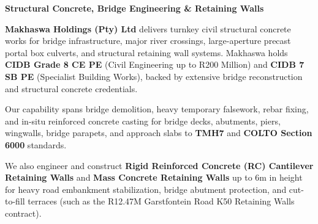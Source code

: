 \documentclass[a4paper,11pt]{article}
\begin{document}
\noindent
\begin{minipage}[t]{0.62\textwidth}
    \vspace{0pt}
    {\large\bfseries\color{mhnavy} Structural Concrete, Bridge Engineering \& Retaining Walls}
    \vspace{0.12cm}

    {\fontsize{9pt}{13pt}\selectfont\color{mhtext}
    \textbf{Makhaswa Holdings (Pty) Ltd} delivers turnkey civil structural concrete works for bridge infrastructure, major river crossings, large-aperture precast portal box culverts, and structural retaining wall systems. Makhaswa holds \textbf{CIDB Grade 8 CE PE} (Civil Engineering up to R200 Million) and \textbf{CIDB 7 SB PE} (Specialist Building Works), backed by extensive bridge reconstruction and structural concrete credentials.
    }

    \vspace{0.22cm}

    {\fontsize{9pt}{13pt}\selectfont\color{mhtext}
    Our capability spans bridge demolition, heavy temporary falsework, rebar fixing, and in-situ reinforced concrete casting for bridge decks, abutments, piers, wingwalls, bridge parapets, and approach slabs to \textbf{TMH7} and \textbf{COLTO Section 6000} standards.
    }

    \vspace{0.22cm}

    {\fontsize{9pt}{13pt}\selectfont\color{mhtext}
    We also engineer and construct \textbf{Rigid Reinforced Concrete (RC) Cantilever Retaining Walls} and \textbf{Mass Concrete Retaining Walls} up to 6m in height for heavy road embankment stabilization, bridge abutment protection, and cut-to-fill terraces (such as the R12.47M Garstfontein Road K50 Retaining Walls contract).
    }
\end{minipage}
\hfill
\end{document}
